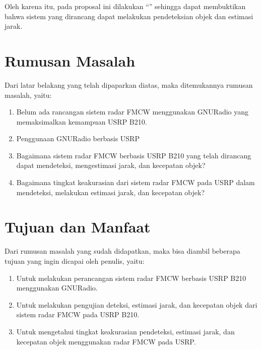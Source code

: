 Oleh karena itu, pada proposal ini dilakukan “\judul” sehingga dapat membuktikan bahwa sistem yang dirancang dapat melakukan pendeteksian objek dan estimasi jarak.

\section{Rumusan Masalah}
Dari latar belakang yang telah dipaparkan diatas, maka ditemukannya rumusan masalah, yaitu:\\
\begin{enumerate}
	\item Belum ada rancangan sistem radar FMCW menggunakan GNURadio yang memaksimalkan kemampuan USRP B210.
	\item Penggunaan GNURadio berbasis USRP 
	\item Bagaimana sistem radar FMCW berbasis USRP B210 yang telah dirancang dapat mendeteksi, mengestimasi jarak, dan kecepatan objek?
	\item Bagaimana tingkat keakurasian dari sistem radar FMCW pada USRP dalam mendeteksi, melakukan estimasi jarak, dan kecepatan objek?
\end{enumerate} 

\section{Tujuan dan Manfaat}
Dari rumusan masalah yang sudah didapatkan, maka bisa diambil beberapa tujuan yang ingin dicapai oleh penulis, yaitu:\\

\begin{enumerate}
	\item Untuk melakukan perancangan sistem radar FMCW berbasis USRP B210 menggunakan GNURadio.
	\item Untuk melakukan pengujian deteksi, estimasi jarak, dan kecepatan objek dari sistem radar FMCW pada USRP B210.
	\item Untuk mengetahui tingkat keakurasian pendeteksi, estimasi jarak, dan kecepatan objek menggunakan radar FMCW pada USRP.
\end{enumerate}

